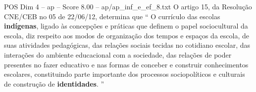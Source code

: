 \begin{textsample}{POS Dim 4 – ap – Score 8.00 – ap/ap\_inf\_e\_ef\_8.txt}
O artigo 15, da Resolução CNE/CEB no 05 de 22/06/12, determina que “ O currículo das escolas \textbf{indígenas}, ligado às concepções e práticas que definem o papel sociocultural da escola, diz respeito aos modos de organização dos tempos e espaços da escola, de suas atividades pedagógicas, das relações sociais tecidas no cotidiano escolar, das interações do ambiente educacional com a sociedade, das relações de poder presentes no fazer educativo e nas formas de conceber e construir conhecimentos escolares, constituindo parte importante dos processos sociopolíticos e culturais de construção de \textbf{identidades}. ”

\end{textsample}
